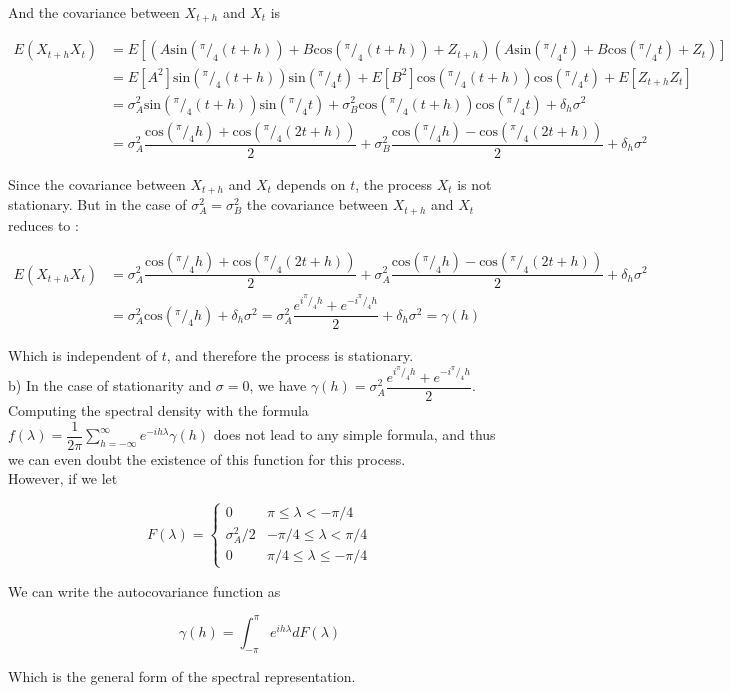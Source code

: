 \documentclass{article}
\begin{document}
And the covariance between $X_{t+h}$ and $X_t$ is

\begin{align*}
E(X_{t+h}X_t)&=E[(A\text{sin}(^{\pi}/_4 (t+h)) +B\text{cos}(^{\pi}/_4 (t+h))+Z_{t+h})(A\text{sin}(^{\pi}/_4 t) +B\text{cos}(^{\pi}/_4 t)+Z_{t})]\\
&= E[A^2]\text{sin}(^{\pi}/_4 (t+h))\text{sin}(^{\pi}/_4 t) +E[B^2]\text{cos}(^{\pi}/_4 (t+h))\text{cos}(^{\pi}/_4 t)+E[Z_{t+h}Z_t]\\
&= \sigma_A^2\text{sin}(^{\pi}/_4 (t+h))\text{sin}(^{\pi}/_4 t) +\sigma_B^2\text{cos}(^{\pi}/_4 (t+h))\text{cos}(^{\pi}/_4 t)+\delta_h \sigma^2\\
&= \sigma_A^2\dfrac{\text{cos}(^{\pi}/_4 h)+\text{cos}(^{\pi}/_4 (2t+h))}{2}+\sigma_B^2\dfrac{\text{cos}(^{\pi}/_4 h)-\text{cos}(^{\pi}/_4 (2t+h))}{2}+\delta_h \sigma^2
\end{align*}

Since the covariance between $X_{t+h}$ and $X_t$ depends on $t$, the process $X_t$ is not stationary. But in the case of $\sigma_A^2=\sigma_B^2$ the covariance between $X_{t+h}$ and $X_t$ reduces to : 

\begin{align*}
E(X_{t+h}X_t)&= \sigma_A^2\dfrac{\text{cos}(^{\pi}/_4 h)+\text{cos}(^{\pi}/_4 (2t+h))}{2}+\sigma_A^2\dfrac{\text{cos}(^{\pi}/_4 h)-\text{cos}(^{\pi}/_4 (2t+h))}{2}+\delta_h \sigma^2\\
&=\sigma_A^2\text{cos}(^{\pi}/_4 h)+\delta_h \sigma^2=\sigma_A^2\dfrac{e^{i^{\pi}/_4 h}+e^{-i^{\pi}/_4 h}}{2}+\delta_h \sigma^2=\gamma(h)
\end{align*}

Which is independent of $t$, and therefore the process is stationary.\\


b)
In the case of stationarity and $\sigma=0$, we have  $\gamma(h)=\sigma_A^2\dfrac{e^{i^{\pi}/_4 h}+e^{-i^{\pi}/_4 h}}{2}$. \\

Computing the spectral density with the formula $\displaystyle f(\lambda) =\dfrac{1}{2\pi} \sum_{h=-\infty}^{\infty} e^{-ih\lambda} \gamma(h)$ does not lead to any simple formula, and thus we can even doubt the existence of this function for this process.\\

However, if we let 

$$F(\lambda)=
\left\{ 
\begin{array}{cc}
 0 & \pi \leq \lambda < -\pi/4 \\
 \sigma_A^2/2 &  -\pi/4 \leq \lambda < \pi/4 \\
 0 &  \pi/4 \leq \lambda \leq -\pi/4
 \end{array}
\right.$$

We can write the autocovariance function as  

$$\gamma(h)=\int_{-\pi}^{\pi} e^{ih\lambda}dF(\lambda)$$

Which is the general form of the spectral representation.
\end{document}
